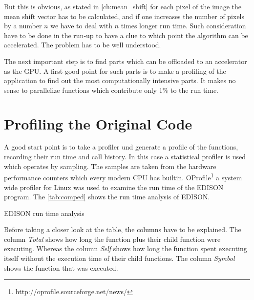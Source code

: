 But this is obvious, as stated in \autoref{ch:mean_shift} for each
pixel of the image the mean shift vector has to be calculated, and if
one increases the number of pixels by a number $n$ we have to deal
with $n$ times longer run time. Such consideration have to be done in
the run-up to have a clue to which point the algorithm can be
accelerated. The problem has to be well understood.

The next important step is to find parts which can be offloaded to an
accelerator as the \gls{GPU}. A first good point for such parts is to
make a profiling of the application to find out the most
computationally intensive parts. It makes no sense to parallelize
functions which contribute only 1\% to the run time.
    
\section{Profiling the Original Code} %
\label{sec:run_time_analysis_of_the_original_code}
A good start point is to take a profiler und generate a profile of the
functions, recording their run time and call history. In this case a
statistical profiler is used which operates by sampling. The samples
are taken from the hardware performance counters which every modern
\gls{CPU} has builtin.
OProfile\footnote{http://oprofile.sourceforge.net/news/} a system wide
profiler for Linux was used to examine the run time of the
\gls{EDISON} program. The \autoref{tab:comped} shows the run time
analysis of \gls{EDISON}.

\begin{table}[ht]
  \centering
  \caption[EDISON run time profile]{ \gls{EDISON} run time analysis}
  \label{tab:comped}
\end{table}

Before taking a closer look at the table, the columns have to be
explained. The column \emph{Total} shows how long the function plus
their child function were executing. Whereas the column \emph{Self}
shows how long the function spent executing itself without the
execution time of their child functions. The column \emph{Symbol}
shows the function that was executed.

